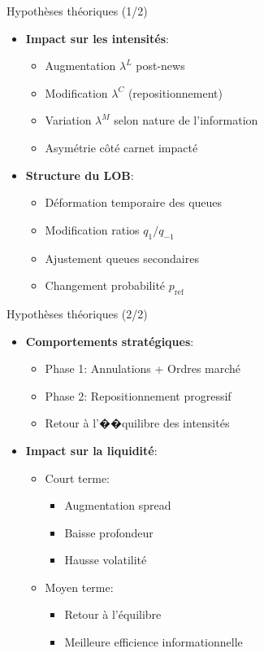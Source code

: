 \documentclass[aspectratio=169]{beamer}  %
\begin{document}
\begin{frame}{Hypothèses théoriques (1/2)}
    \begin{itemize}
        \item \textbf{Impact sur les intensités}:
        \begin{itemize}
            \item Augmentation $\lambda^L$ post-news
            \item Modification $\lambda^C$ (repositionnement)
            \item Variation $\lambda^M$ selon nature de l'information
            \item Asymétrie côté carnet impacté
        \end{itemize}
        \item \textbf{Structure du LOB}:
        \begin{itemize}
            \item Déformation temporaire des queues
            \item Modification ratios $q_1/q_{-1}$
            \item Ajustement queues secondaires
            \item Changement probabilité $p_{\text{ref}}$
        \end{itemize}
    \end{itemize}
\end{frame}

\begin{frame}{Hypothèses théoriques (2/2)}
    \begin{itemize}
        \item \textbf{Comportements stratégiques}:
        \begin{itemize}
            \item Phase 1: Annulations + Ordres marché
            \item Phase 2: Repositionnement progressif
            \item Retour à l'��quilibre des intensités
        \end{itemize}
        \item \textbf{Impact sur la liquidité}:
        \begin{itemize}
            \item Court terme:
            \begin{itemize}
                \item Augmentation spread
                \item Baisse profondeur
                \item Hausse volatilité
            \end{itemize}
            \item Moyen terme:
            \begin{itemize}
                \item Retour à l'équilibre
                \item Meilleure efficience informationnelle
            \end{itemize}
        \end{itemize}
    \end{itemize}
\end{frame}
\end{document}
